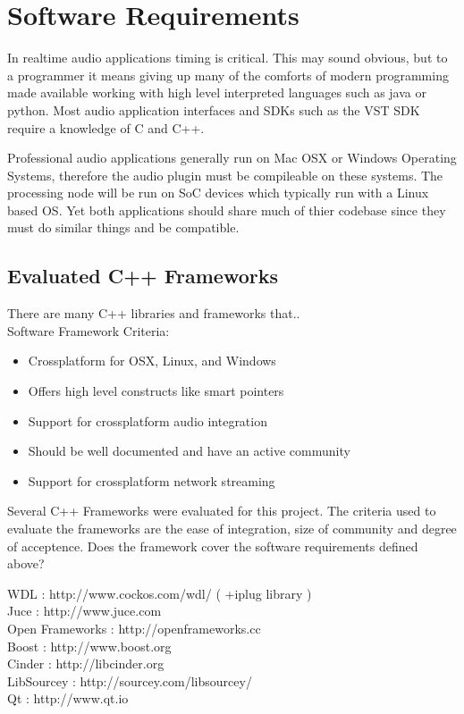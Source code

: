 \section{Software Requirements}

In realtime audio applications timing is critical. This may sound obvious, but to a programmer it means giving up many of the comforts of modern programming made available working with high level interpreted languages such as java or python. Most audio application interfaces and SDKs such as the VST SDK require a knowledge of C and C++.

Professional audio applications generally run on Mac OSX or Windows Operating Systems, therefore the audio plugin must be compileable on these systems. The processing node will be run on SoC devices which typically run with a Linux based OS. Yet both applications should share much of thier codebase since they must do similar things and be compatible.

\subsection{Evaluated C++ Frameworks}

There are many C++ libraries and frameworks that..\\

Software Framework Criteria:

\begin{itemize}

\item Crossplatform for OSX, Linux, and Windows
\item Offers high level constructs like smart pointers
\item Support for crossplatform audio integration
\item Should be well documented and have an active community
\item Support for crossplatform network streaming

\end{itemize}

Several C++ Frameworks were evaluated for this project. The criteria used to evaluate the frameworks are the ease of
integration, size of community and degree of acceptence. Does the framework cover the software requirements defined
above?

WDL : http://www.cockos.com/wdl/ ( +iplug library ) \\
Juce : http://www.juce.com \\
Open Frameworks : http://openframeworks.cc \\
Boost : http://www.boost.org \\
Cinder : http://libcinder.org \\
LibSourcey : http://sourcey.com/libsourcey/ \\
Qt : http://www.qt.io \\

